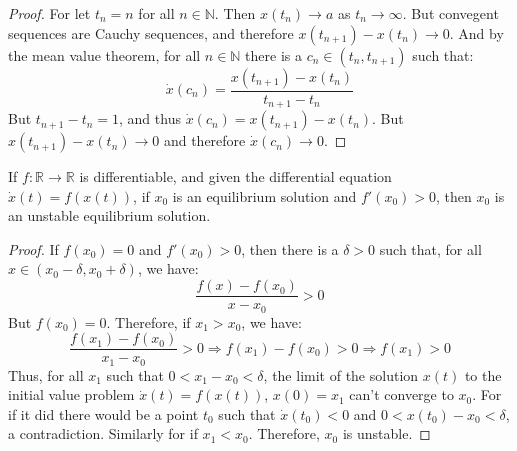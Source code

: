                \begin{proof}
                    For let $t_{n}=n$ for all $n\in\mathbb{N}$. Then
                    $x(t_{n})\rightarrow{a}$ as $t_{n}\rightarrow\infty$.
                    But convegent sequences are Cauchy sequences, and
                    therefore $x(t_{n+1})-x(t_{n})\rightarrow{0}$.
                    And by the mean value theorem, for all
                    $n\in\mathbb{N}$ there is a
                    $c_{n}\in(t_{n},t_{n+1})$ such that:
                    \begin{equation*}
                        \dot{x}(c_{n})
                        =\frac{x(t_{n+1})-x(t_{n})}{t_{n+1}-t_{n}}
                    \end{equation*}
                    But $t_{n+1}-t_{n}=1$, and thus
                    $\dot{x}(c_{n})=x(t_{n+1})-x(t_{n})$. But
                    $x(t_{n+1})-x(t_{n})\rightarrow{0}$ and therefore
                    $\dot{x}(c_{n})\rightarrow{0}$.
                \end{proof}
                \begin{theorem}
                    If $f:\mathbb{R}\rightarrow\mathbb{R}$ is differentiable,
                    and given the differential equation
                    $\dot{x}(t)=f(x(t))$, if $x_{0}$ is an equilibrium
                    solution and $f'(x_{0})>0$, then $x_{0}$ is
                    an unstable equilibrium solution.
                \end{theorem}
                \begin{proof}
                    If $f(x_{0})=0$ and $f'(x_{0})>0$, then there is a
                    $\delta>0$ such that, for all
                    $x\in(x_{0}-\delta,x_{0}+\delta)$, we have:
                    \begin{equation*}
                        \frac{f(x)-f(x_{0})}{x-x_{0}}>0
                    \end{equation*}
                    But $f(x_{0})=0$. Therefore, if $x_{1}>x_{0}$, we have:
                    \begin{equation*}
                        \frac{f(x_{1})-f(x_{0})}{x_{1}-x_{0}}>0
                        \Rightarrow
                        f(x_{1})-f(x_{0})>0
                        \Rightarrow
                        f(x_{1})>0
                    \end{equation*}
                    Thus, for all $x_{1}$ such that
                    $0<x_{1}-x_{0}<\delta$, the limit of
                    the solution $x(t)$ to the initial value problem
                    $\dot{x}(t)=f(x(t))$, $x(0)=x_{1}$ can't converge to
                    $x_{0}$. For if it did there would be a point
                    $t_{0}$ such that $\dot{x}(t_{0})<0$ and
                    $0<x(t_{0})-x_{0}<\delta$, a contradiction. Similarly
                    for if $x_{1}<x_{0}$. Therefore, $x_{0}$ is unstable.
                \end{proof}
